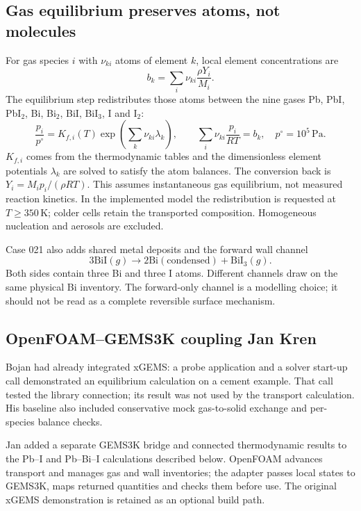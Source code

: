 \documentclass[10pt,a4paper]{article}
\begin{document}
\subsection{Gas equilibrium preserves atoms, not molecules}
For gas species $i$ with $\nu_{ki}$ atoms of element $k$, local element
concentrations are
\begin{equation}
 b_k=\sum_i\nu_{ki}\frac{\rho Y_i}{M_i}.
 \label{eq:elements}
\end{equation}
The equilibrium step redistributes those atoms between the nine gases
Pb, PbI, PbI$_2$, Bi, Bi$_2$, BiI, BiI$_3$, I and I$_2$:
\begin{equation}
 \frac{p_i}{p^\circ}=K_{f,i}(T)
  \exp\!\left(\sum_k\nu_{ki}\lambda_k\right),\qquad
 \sum_i\nu_{ki}\frac{p_i}{RT}=b_k,
 \quad p^\circ=10^5\,\mathrm{Pa}.
 \label{eq:equilibrium}
\end{equation}
$K_{f,i}$ comes from the thermodynamic tables and the dimensionless
element potentials $\lambda_k$ are solved to satisfy the atom balances.
The conversion back is $Y_i=M_ip_i/(\rho RT)$. This assumes instantaneous
gas equilibrium, not measured reaction kinetics. In the implemented model
the redistribution is requested at $T\ge350$\,K; colder cells retain the
transported composition. Homogeneous nucleation and aerosols are excluded.

Case 021 also adds shared metal deposits and the forward wall channel
\begin{equation}
 3\mathrm{BiI}(g)\longrightarrow
 2\mathrm{Bi}(\mathrm{condensed})+\mathrm{BiI}_3(g).
\end{equation}
Both sides contain three Bi and three I atoms. Different channels draw
on the same physical Bi inventory. The forward-only channel is a modelling
choice; it should not be read as a complete reversible surface mechanism.

\clearpage
\subsection{OpenFOAM--GEMS3K coupling \hfill\normalfont\small\color{PSIgray}Jan Kren}
Bojan had already integrated xGEMS: a probe application and a solver
start-up call demonstrated an equilibrium calculation on a cement example.
That call tested the library connection; its result was not used by the
transport calculation. His baseline also included conservative mock
gas-to-solid exchange and per-species balance checks.

Jan added a separate GEMS3K bridge and connected thermodynamic results
to the Pb--I and Pb--Bi--I calculations described below. OpenFOAM advances
transport and manages gas and wall inventories; the adapter passes local
states to GEMS3K, maps returned quantities and checks them before use.
The original xGEMS demonstration is retained as an optional build path.
\end{document}
